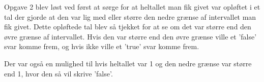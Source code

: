 Opgave 2 blev løst ved først at sørge for at heltallet man fik givet var opløftet i et tal der gjorde at den var lig med eller større den nedre grænse af intervallet man fik givet. Dette opløftede tal blev så tjekket for at se om det var større end den øvre grænse af intervallet. Hvis den var større end den øvre grænse ville et 'false' svar komme frem, og hvis ikke ville et 'true' svar komme frem.

Der var også en mulighed til hvis heltallet var 1 og den nedre grænse var større end 1, hvor den så vil skrive 'false'.